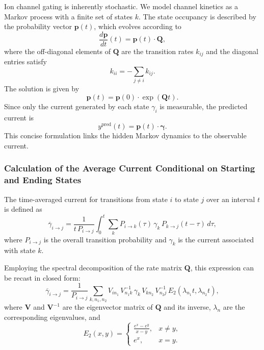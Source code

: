 \documentclass[pdflatex,sn-nature]{sn-jnl}%
\begin{document}
Ion channel gating is inherently stochastic. We model channel kinetics as a Markov process with a finite set of states \(k\). The state occupancy is described by the probability vector \(\boldsymbol{p}(t)\), which evolves according to
\begin{equation}
	\frac{d\boldsymbol{p}}{dt}(t) = \boldsymbol{p}(t)\cdot \boldsymbol{Q},
	\label{eq:master_equation_short}
\end{equation}
where the off-diagonal elements of \(\boldsymbol{Q}\) are the transition rates \(k_{ij}\) and the diagonal entries satisfy
\begin{equation}
	k_{ii} = -\sum_{j\neq i} k_{ij}.
	\label{eq:Q_diag_short}
\end{equation}
The solution is given by
\begin{equation}
	\boldsymbol{p}(t) = \boldsymbol{p}(0) \cdot \exp(\boldsymbol{Q}t).
	\label{eq:master equation solution}
\end{equation}
Since only the current generated by each state \(\gamma_i\) is measurable, the predicted current is
\begin{equation}
	y^{\text{pred}}(t) = \boldsymbol{p}(t)\cdot \boldsymbol{\gamma}.
	\label{eq:current_pred_short}
\end{equation}
This concise formulation links the hidden Markov dynamics to the observable current.

\subsubsection{Calculation of the Average Current Conditional on Starting and Ending States}\label{sec:avg_current_calc}

The time-averaged current for transitions from state \(i\) to state \(j\) over an interval \(t\) is defined as
\begin{equation}
	\overline{\gamma}_{i \rightarrow j} = \frac{1}{t\,P_{i\rightarrow j}} \int_0^t \sum_k P_{i\rightarrow k}(\tau)\,\gamma_k\,P_{k\rightarrow j}(t-\tau)\,d\tau,
	\label{eq:gamma_ij_integral_short}
\end{equation}
where \(P_{i\rightarrow j}\) is the overall transition probability and \(\gamma_k\) is the current associated with state \(k\).

Employing the spectral decomposition of the rate matrix \(\mathbf{Q}\), this expression can be recast in closed form:
\begin{equation}
	\overline{\gamma}_{i \rightarrow j} = \frac{1}{P_{i\rightarrow j}} \sum_{k, n_1, n_2} V_{i n_1}\,V^{-1}_{n_1 k}\,\gamma_k\,V_{k n_2}\,V^{-1}_{n_2 j}\,E_2(\lambda_{n_1}t,\lambda_{n_2}t),
	\label{eq:gamma_ij_formula_short}
\end{equation}
where \(\mathbf{V}\) and \(\mathbf{V}^{-1}\) are the eigenvector matrix of \(\mathbf{Q}\) and its inverse, \(\lambda_{n}\) are the corresponding eigenvalues, and
\begin{equation}
	E_2(x,y)=
	\begin{cases}
		\frac{e^x-e^y}{x-y}, & x\neq y, \\
		e^x, & x=y.
	\end{cases}
	\label{eq:E2_short}
\end{equation}
\end{document}

